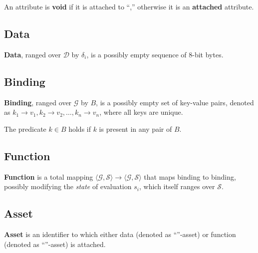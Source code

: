 \begin{definition}
An attribute is \textbf{void} if it is attached to ``\stx{\varnothing},''
otherwise it is an \textbf{attached} attribute.
\end{definition}

\subsection{Data}\label{sec:data}

\begin{definition}[Data]
\textbf{Data}, ranged over \(\mathcal{D}\) by \(\delta_i\), is a possibly
empty sequence of 8-bit bytes.
\end{definition}

\subsection{Binding}\label{sec:binding}

\begin{definition}[Binding]
\textbf{Binding}, ranged over \(\mathcal{G}\) by \(B\), is a possibly empty set of key-value pairs,
denoted as \( k_1 \to v_1, k_2 \to v_2, \dots, k_n \to v_n \), where all keys are unique.
\end{definition}

The predicate \(k \in B\) holds if \(k\) is present in any pair of \(B\).

\subsection{Function}\label{sec:function}

\begin{definition}[Function]
\textbf{Function} is a total mapping
\(\langle \mathcal{G}, \mathcal{S} \rangle \to \langle \mathcal{G}, \mathcal{S} \rangle\)
that maps binding to binding, possibly modifying the \emph{state} of evaluation \(s_i\),
which itself ranges over \(\mathcal{S}\).
\end{definition}

\subsection{Asset}\label{sec:asset}

\begin{definition}[Asset]
\textbf{Asset} is an identifier to which either data
(denoted as ``\stx{\Delta}''-asset) or function
(denoted as ``\stx{\lambda}''-asset) is attached.
\end{definition}

